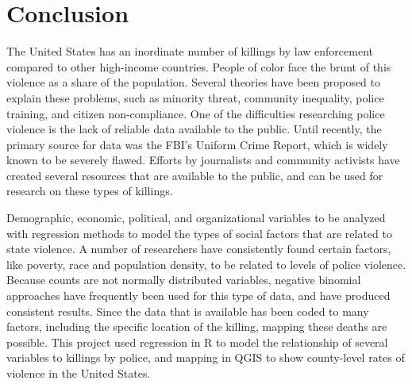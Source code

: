 \documentclass[sigconf]{acmart}
\begin{document}
\section{Conclusion}
The United States has an inordinate number of killings by law enforcement compared to other high-income countries.  People of color face the brunt of this violence as a share of the population.  Several theories have been proposed to explain these problems, such as minority threat, community inequality, police training, and citizen non-compliance.  One of the difficulties researching police violence is the lack of reliable data available to the public.  Until recently, the primary source for data was the FBI's Uniform Crime Report, which is widely known to be severely flawed.  Efforts by journalists and community activists have created several resources that are available to the public, and can be used for research on these types of killings.

Demographic, economic, political, and organizational variables to be analyzed with regression methods to model the types of social factors that are related to state violence.  A number of researchers have consistently found certain factors, like poverty, race and population density, to be related to levels of police violence.   Because counts are not normally distributed variables, negative binomial approaches have frequently been used for this type of data, and have produced consistent results.  Since the data that is available has been coded to many factors, including the specific location of the killing, mapping these deaths are possible.  This project used regression in R to model the relationship of several variables to killings by police, and mapping in QGIS to show county-level rates of violence in the United States.



 
\end{document}

